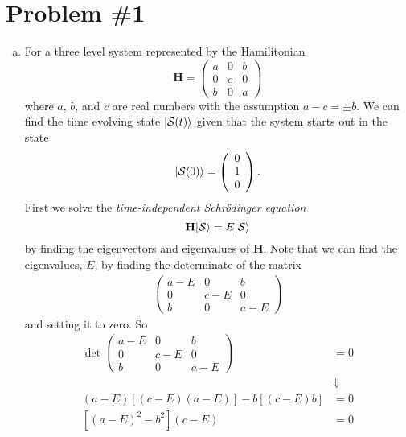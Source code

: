 \documentclass[11pt]{article}
\numberwithin{equation}{section}
\begin{document}


\section{Problem \#1}
\begin{enumerate}[(a)]
\item
For a three level system represented by the Hamilitonian
$$\mathbf{H} = \left(\begin{array}{ccc}
               a    &0    &b\\
               0    &c    &0\\
               b    &0    &a
\end{array}\right)$$
where $a$, $b$, and $c$ are real numbers with the assumption $a-c = \pm b$. We can find the time evolving state $|{\mathcal{S}(t)}\rangle$ given that the system starts out in the state
$$|{\mathcal{S}(0)}\rangle = \left(\begin{array}{c}
               0    \\
               1    \\
               0    
\end{array}\right).$$
First we solve the \emph{time-independent Schr\"{o}dinger equation}
\begin{equation}
\mathbf{H}|{\mathcal{S}}\rangle = E|{\mathcal{S}}\rangle
\end{equation}
by finding the eigenvectors and eigenvalues of $\mathbf{H}$. Note that we can find the eigenvalues, $E$, by finding the determinate of the matrix
\begin{align*}
\left(\begin{array}{ccc}
               a-E    &0    &b\\
               0    &c-E    &0\\
               b    &0    &a-E
\end{array}\right)
\end{align*}
and setting it to zero. So
\begin{align*}
\det\left(\begin{array}{ccc}
               a-E    &0    &b\\
               0    &c-E    &0\\
               b    &0    &a-E
\end{array}\right) &= 0\\
&\Downarrow\\
(a-E)\left[(c-E)(a-E)\right] - b\left[(c-E)b\right] &= 0 \\
\left[(a-E)^2-b^2\right](c-E) &= 0

\end{align*}
\end{enumerate}
\end{document}
